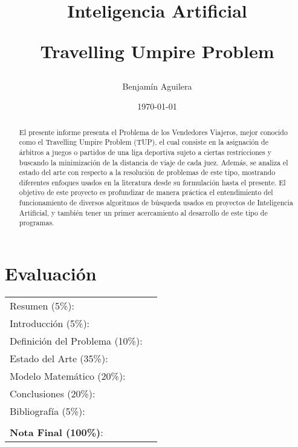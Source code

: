 \documentclass[letter, 10pt]{article}
\begin{document}
\title{Inteligencia Artificial \\ \begin{Large}Travelling Umpire Problem\end{Large}}
\author{Benjam\'in Aguilera}
\date{\today}
\maketitle


\section*{Evaluaci\'on}

\begin{tabular}{ll}
  Resumen (5\%):                    & \underline{\hspace{2cm}} \\
  Introducci\'on (5\%):             & \underline{\hspace{2cm}} \\
  Definici\'on del Problema (10\%): & \underline{\hspace{2cm}} \\
  Estado del Arte (35\%):           & \underline{\hspace{2cm}} \\
  Modelo Matem\'atico (20\%):       & \underline{\hspace{2cm}} \\
  Conclusiones (20\%):              & \underline{\hspace{2cm}} \\
  Bibliograf\'ia (5\%):             & \underline{\hspace{2cm}} \\
                                    &                          \\
  \textbf{Nota Final (100\%)}:      & \underline{\hspace{2cm}}
\end{tabular}
\vspace{2cm}

\begin{abstract}

  El presente informe presenta el Problema de los Vendedores Viajeros, mejor conocido como el Travelling Umpire Problem (TUP), el cual consiste en la asignaci\'on de \'arbitros a juegos o partidos de una liga deportiva sujeto a ciertas restricciones y buscando la minimizaci\'on de la distancia de viaje de cada juez. Adem\'as, se analiza el estado del arte con respecto a la resoluci\'on de problemas de este tipo, mostrando diferentes enfoques usados en la literatura desde su formulaci\'on hasta el presente.
  El objetivo de este proyecto es profundizar de manera pr\'actica el entendimiento del funcionamiento de diversos algoritmos de b\'usqueda usados en proyectos de Inteligencia Artificial, y tambi\'en tener un primer acercamiento al desarrollo de este tipo de programas.

\end{abstract}
\end{document}
